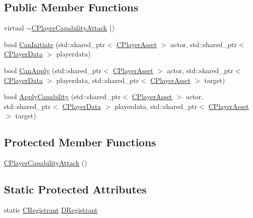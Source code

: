 \subsection*{Public Member Functions}
\begin{DoxyCompactItemize}
\item 
virtual \hyperlink{classCPlayerCapabilityAttack_ac18875f6e891a2e8b805ed42bb001bb3}{$\sim$\+C\+Player\+Capability\+Attack} ()
\item 
bool \hyperlink{classCPlayerCapabilityAttack_ab1cda67a8e637a90accf03d1581d4072}{Can\+Initiate} (std\+::shared\+\_\+ptr$<$ \hyperlink{classCPlayerAsset}{C\+Player\+Asset} $>$ actor, std\+::shared\+\_\+ptr$<$ \hyperlink{classCPlayerData}{C\+Player\+Data} $>$ playerdata)
\item 
bool \hyperlink{classCPlayerCapabilityAttack_ab5cdd55fa3838304fd551426e41f7b17}{Can\+Apply} (std\+::shared\+\_\+ptr$<$ \hyperlink{classCPlayerAsset}{C\+Player\+Asset} $>$ actor, std\+::shared\+\_\+ptr$<$ \hyperlink{classCPlayerData}{C\+Player\+Data} $>$ playerdata, std\+::shared\+\_\+ptr$<$ \hyperlink{classCPlayerAsset}{C\+Player\+Asset} $>$ target)
\item 
bool \hyperlink{classCPlayerCapabilityAttack_a536095f572f9f6af786eaec0376f3771}{Apply\+Capability} (std\+::shared\+\_\+ptr$<$ \hyperlink{classCPlayerAsset}{C\+Player\+Asset} $>$ actor, std\+::shared\+\_\+ptr$<$ \hyperlink{classCPlayerData}{C\+Player\+Data} $>$ playerdata, std\+::shared\+\_\+ptr$<$ \hyperlink{classCPlayerAsset}{C\+Player\+Asset} $>$ target)
\end{DoxyCompactItemize}
\subsection*{Protected Member Functions}
\begin{DoxyCompactItemize}
\item 
\hyperlink{classCPlayerCapabilityAttack_ae9430ec5ce80a461030603c5cab0525c}{C\+Player\+Capability\+Attack} ()
\end{DoxyCompactItemize}
\subsection*{Static Protected Attributes}
\begin{DoxyCompactItemize}
\item 
static \hyperlink{classCPlayerCapabilityAttack_1_1CRegistrant}{C\+Registrant} \hyperlink{classCPlayerCapabilityAttack_a22b5c69229cdc25c3f289de947db148d}{D\+Registrant}
\end{DoxyCompactItemize}
